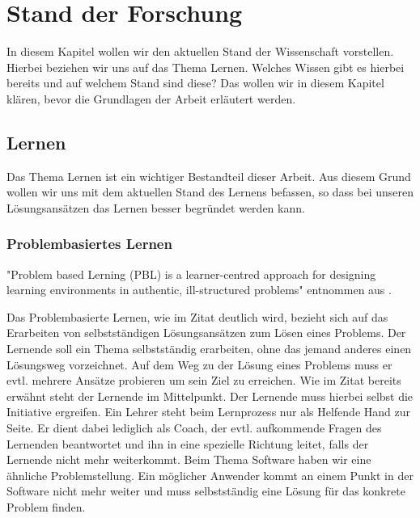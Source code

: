
\chapter{Stand der Forschung}
In diesem Kapitel wollen wir den aktuellen Stand der Wissenschaft vorstellen. Hierbei beziehen wir uns auf das Thema Lernen. Welches Wissen gibt es hierbei bereits und auf welchem Stand sind diese? Das wollen wir in diesem Kapitel klären, bevor die Grundlagen der Arbeit erläutert werden.

\section{Lernen}
Das Thema Lernen ist ein wichtiger Bestandteil dieser Arbeit. Aus diesem Grund wollen wir uns mit dem aktuellen Stand des Lernens befassen, so dass bei unseren Lösungsansätzen das Lernen besser begründet werden kann.


\subsection{Problembasiertes Lernen}
"Problem based Lerning (PBL) is a learner-centred approach for designing learning environments in authentic, ill-structured problems" entnommen aus \cite{problembasiertes}. \par

Das Problembasierte Lernen, wie im Zitat deutlich wird, bezieht sich auf das Erarbeiten von selbstständigen Lösungsansätzen zum Lösen eines Problems. Der Lernende soll ein Thema selbstständig erarbeiten, ohne das jemand anderes einen Lösungsweg vorzeichnet. Auf dem Weg zu der Lösung eines Problems muss er evtl. mehrere Ansätze probieren um sein Ziel zu erreichen. Wie im Zitat bereits erwähnt steht der Lernende im Mittelpunkt. Der Lernende muss hierbei selbst die Initiative ergreifen. Ein Lehrer steht beim Lernprozess nur als Helfende Hand zur Seite. Er dient dabei lediglich als Coach, der evtl. aufkommende Fragen des Lernenden beantwortet und ihn in eine spezielle Richtung leitet, falls der Lernende nicht mehr weiterkommt. Beim Thema Software haben wir eine ähnliche Problemstellung. Ein möglicher Anwender kommt an einem Punkt in der Software nicht mehr weiter und muss selbstständig eine Lösung für das konkrete Problem finden. 
 
